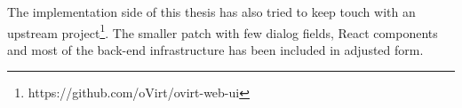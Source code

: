 The implementation side of this thesis has also tried to keep touch with an upstream project\footnote{https://github.com/oVirt/ovirt-web-ui}. The smaller patch with few dialog fields, React components and most of the back-end infrastructure has been included in adjusted form.


 
